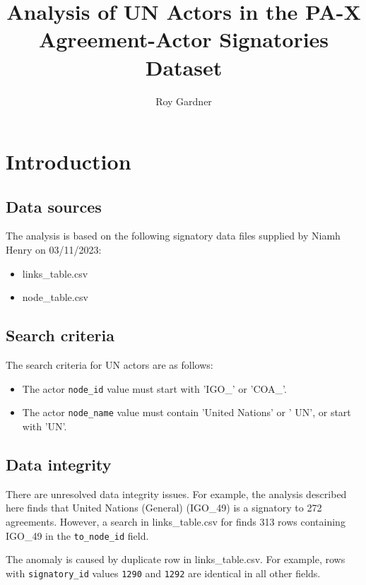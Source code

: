 \documentclass{article}
\title{Analysis of UN Actors in the PA-X Agreement-Actor Signatories Dataset}
\author{Roy Gardner}
\begin{document}

\maketitle

\tableofcontents
\newpage

\section{Introduction}

\subsection{Data sources}
The analysis is based on the following signatory data files supplied by Niamh Henry on 03/11/2023:

\begin{itemize}
\item links\_table.csv
\item node\_table.csv
\end{itemize}

\subsection{Search criteria}

The search criteria for UN actors are as follows:

\begin{itemize}
\item The actor \texttt{node\_id} value must start with 'IGO\_' or 'COA\_'.
\item The actor \texttt{node\_name} value must contain 'United Nations' or ' UN', or start with 'UN'.
\end{itemize}

\subsection{Data integrity}

There are unresolved data integrity issues. For example, the analysis described here finds that United Nations (General) (IGO\_49) is a signatory to 272 agreements. However, a search in links\_table.csv for  finds 313 rows containing IGO\_49 in the  \texttt{to\_node\_id} field. \newline

The anomaly is caused by duplicate row in links\_table.csv. For example, rows with \texttt{signatory\_id} values \texttt{1290} and \texttt{1292} are identical in all other fields.\newline
\end{document}
